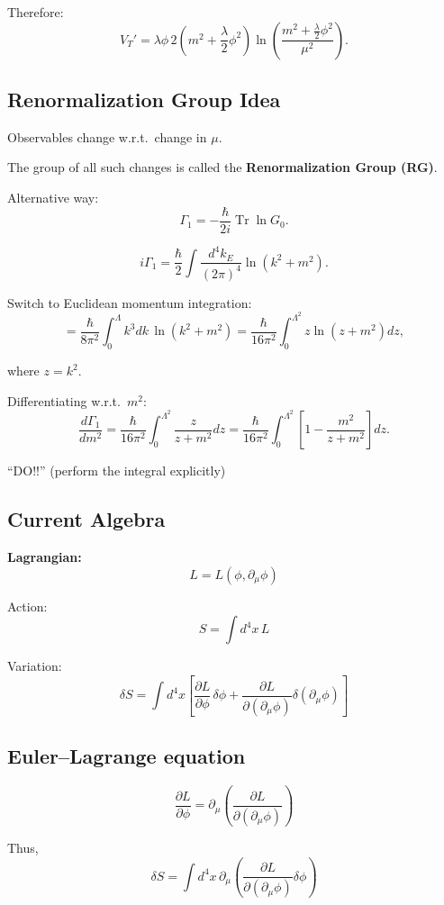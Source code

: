 \documentclass[14pt]{article} %
\begin{document}
Therefore:
\[
V_T' = \lambda \phi \, 2 \left( m^2 + \frac{\lambda}{2} \phi^2 \right)
\ln\!\left( \frac{m^2 + \frac{\lambda}{2} \phi^2}{\mu^2} \right).
\]

\subsection{Renormalization Group Idea}

Observables change w.r.t.\ change in $\mu$.

The group of all such changes is called the 
\textbf{Renormalization Group (RG)}.

Alternative way:
\[
\Gamma_1 = - \frac{\hbar}{2i} \operatorname{Tr} \ln G_0.
\]

\[
i \Gamma_1 = \frac{\hbar}{2} 
\int \frac{d^4 k_E}{(2\pi)^4} \ln (k^2 + m^2).
\]

Switch to Euclidean momentum integration:
\[
= \frac{\hbar}{8 \pi^2} 
\int_0^{\Lambda} k^3 dk \, \ln (k^2 + m^2)
= \frac{\hbar}{16 \pi^2} 
\int_0^{\Lambda^2} z \ln (z + m^2) dz,
\]

where $z = k^2$.

Differentiating w.r.t.\ $m^2$:
\[
\frac{d \Gamma_1}{d m^2}
= \frac{\hbar}{16 \pi^2}
\int_0^{\Lambda^2} \frac{z}{z + m^2} dz
= \frac{\hbar}{16 \pi^2}
\int_0^{\Lambda^2} \left[ 1 - \frac{m^2}{z + m^2} \right] dz.
\]

``DO!!'' (perform the integral explicitly)

\subsection{Current Algebra}

\textbf{Lagrangian:} 
\[
L = L(\phi, \partial_\mu \phi)
\]

Action:
\[
S = \int d^4x \, L
\]

Variation:
\[
\delta S = \int d^4x \left[ 
\frac{\partial L}{\partial \phi}\,\delta\phi 
+ \frac{\partial L}{\partial (\partial_\mu \phi)} \delta (\partial_\mu \phi)
\right]
\]

\subsection*{Euler--Lagrange equation}
\[
\frac{\partial L}{\partial \phi} = \partial_\mu \left( \frac{\partial L}{\partial(\partial_\mu \phi)} \right)
\]

Thus,
\[
\delta S = \int d^4x \, \partial_\mu \left( \frac{\partial L}{\partial(\partial_\mu \phi)} \delta\phi \right)
\]
\end{document}
